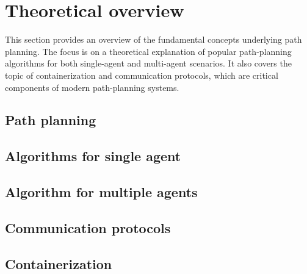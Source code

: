 \chapter{Theoretical overview}
This section provides an overview of the fundamental concepts underlying path planning. The focus is on a theoretical explanation of popular path-planning algorithms for both single-agent and multi-agent scenarios. It also covers the topic of containerization and communication protocols, which are critical components of modern path-planning systems.
\section{Path planning}


\section{Algorithms for single agent}


\section{Algorithm for multiple agents}


\section{Communication protocols}


\section{Containerization}

